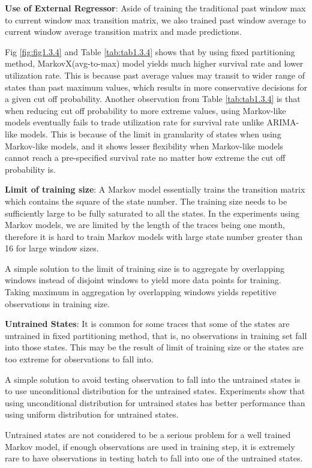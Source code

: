 \documentclass{article}
\begin{document}
\begin{flushleft}
\textbf{Use of External Regressor}: Aside of training the traditional past window max to current window max transition matrix, we also trained past window average to current window average transition matrix and made predictions. 

Fig \ref{fig:fig1.3.4} and Table \ref{tab:tab1.3.4} shows that by using fixed partitioning method, MarkovX(avg-to-max) model yields much higher survival rate and lower utilization rate. This is because past average values may transit to wider range of states than past maximum values, which results in more conservative decisions for a given cut off probability. Another observation from Table \ref{tab:tab1.3.4} is that when reducing cut off probability to more extreme values, using Markov-like models eventually fails to trade utilization rate for survival rate unlike ARIMA-like models. This is because of the limit in granularity of states when using Markov-like models, and it shows lesser flexibility when Markov-like models cannot reach a pre-specified survival rate no matter how extreme the cut off probability is.
\end{flushleft}

\begin{flushleft}
\textbf{Limit of training size}: A Markov model essentially trains the transition matrix which contains the square of the state number. The training size needs to be sufficiently large to be fully saturated to all the states. In the experiments using Markov models, we are limited by the length of the traces being one month, therefore it is hard to train Markov models with large state number greater than 16 for large window sizes.

A simple solution to the limit of training size is to aggregate by overlapping windows instead of disjoint windows to yield more data points for training. Taking maximum in aggregation by overlapping windows yields repetitive observations in training size.
\end{flushleft}

\begin{flushleft}
\textbf{Untrained States}: It is common for some traces that some of the states are untrained in fixed partitioning method, that is, no observations in training set fall into those states. This may be the result of limit of training size or the states are too extreme for observations to fall into. 

A simple solution to avoid testing observation to fall into the untrained states is to use unconditional distribution for the untrained states. Experiments show that using unconditional distribution for untrained states has better performance than using uniform distribution for untrained states.

Untrained states are not considered to be a serious problem for a well trained Markov model, if enough observations are used in training step, it is extremely rare to have observations in testing batch to fall into one of the untrained states.
\end{flushleft}
\end{document}
